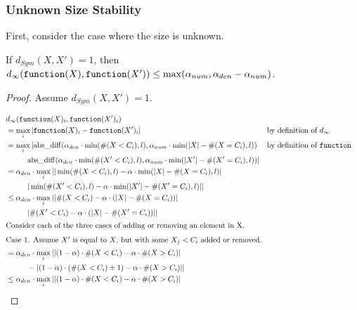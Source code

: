 \documentclass{article}
\begin{document}
\subsubsection{Unknown Size Stability}
\label{unsized-stability}
First, consider the case where the size is unknown.

\begin{lemma}
    \label{single-change-stab-sym}
    If $d_{Sym}(X, X') = 1$, then $d_\infty(\texttt{function}(X), \texttt{function}(X')) \le \max(\alpha_{num}, \alpha_{den} - \alpha_{num})$.
\end{lemma}

\begin{proof}
Assume $d_{Sym}(X, X') = 1$. 

\begin{align*}
    &d_\infty(\function(X)_i, \function(X')_i) \\
    &= \max\limits_{i} |\function(X)_i - \function(X')_i| &&\text{by definition of } d_\infty \\
    &= \max\limits_{i} |\mathrm{abs\_diff}(\alpha_{den} \cdot \min(\#(X < C_i), l), \alpha_{num} \cdot \min(|X| - \#(X = C_i), l)) &&\text{by definition of } \function
        \\&\hspace{1cm}\mathrm{abs\_diff}(\alpha_{den} \cdot \min(\#(X' < C_i), l), \alpha_{num} \cdot \min(|X'| - \#(X' = C_i), l))| \\
    &= \alpha_{den} \cdot \max\limits_{i} ||\min(\#(X < C_i), l) - \alpha \cdot \min(|X| - \#(X = C_i), l)|
        \\&\hspace{1cm}|\min(\#(X' < C_i), l) - \alpha \cdot \min(|X'| - \#(X' = C_i), l)|| \\
    &\le \alpha_{den} \cdot \max\limits_{i} ||\#(X < C_i) - \alpha \cdot (|X| - \#(X = C_i))|
        \\&\hspace{1cm}|\#(X' < C_i) - \alpha \cdot (|X| - \#(X' = C_i))|| \\
\intertext{Consider each of the three cases of adding or removing an element in X.}
\intertext{Case 1. Assume $X'$ is equal to $X$, but with some $X_j < C_i$ added or removed.}
    &= \alpha_{den} \cdot \max\limits_{i} ||(1 - \alpha) \cdot \#(X < C_i) - \alpha \cdot \#(X > C_i)| 
        \\&\hspace{1cm} - |(1 - \alpha) \cdot (\#(X < C_i) \pm 1) - \alpha \cdot \#(X > C_i)|| \\
    &\leq \alpha_{den} \cdot  \max\limits_{i} ||(1 - \alpha) \cdot \#(X < C_i) - \alpha \cdot \#(X > C_i)|

\end{align*}
\end{proof}
\end{document}
